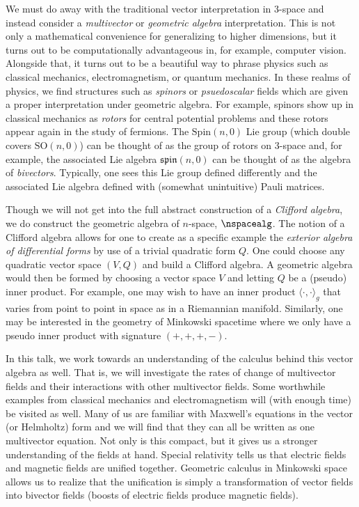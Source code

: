 We must do away with the traditional vector interpretation in 3-space and instead consider a \emph{multivector} or \emph{geometric algebra} interpretation. This is not only a mathematical convenience for generalizing to higher dimensions, but it turns out to be computationally advantageous in, for example, computer vision.  Alongside that, it turns out to be a beautiful way to phrase physics such as classical mechanics, electromagnetism, or quantum mechanics.  In these realms of physics, we find structures such as \emph{spinors} or \emph{psuedoscalar} fields which are given a proper interpretation under geometric algebra. For example, spinors show up in classical mechanics as \emph{rotors} for central potential problems and these rotors appear again in the study of fermions.  The $\textrm{Spin}(n,0)$ Lie group (which double covers $\mathrm{SO}(n,0)$) can be thought of as the group of rotors on 3-space and, for example, the associated Lie algebra $\mathfrak{spin}(n,0)$ can be thought of as the algebra of \emph{bivectors}. Typically, one sees this Lie group defined differently and the associated Lie algebra defined with (somewhat unintuitive) Pauli matrices. 

Though we will not get into the full abstract construction of a \emph{Clifford algebra}, we do construct the geometric algebra of $n$-space, $\nspacealg$.  The notion of a Clifford algebra allows for one to create as a specific example the \emph{exterior algebra of differential forms} by use of a trivial quadratic form $Q$.  One could choose any quadratic vector space $(V,Q)$ and build a Clifford algebra.  A geometric algebra would then be formed by choosing a vector space $V$ and letting $Q$ be a (pseudo) inner product.  For example, one may wish to have an inner product $\langle \cdot, \cdot \rangle_g$ that varies from point to point in space as in a Riemannian manifold.  Similarly, one may be interested in the geometry of Minkowski spacetime where we only have a pseudo inner product with signature $(+,+,+,-)$.  

In this talk, we work towards an understanding of the calculus behind this vector algebra as well.  That is, we will investigate the rates of change of multivector fields and their interactions with other multivector fields.  Some worthwhile examples from classical mechanics and electromagnetism will (with enough time) be visited as well.  Many of us are familiar with Maxwell's equations in the vector (or Helmholtz) form and we will find that they can all be written as one multivector equation.  Not only is this compact, but it gives us a stronger understanding of the fields at hand. Special relativity tells us that electric fields and magnetic fields are unified together.  Geometric calculus in Minkowski space allows us to realize that the unification is simply a transformation of vector fields into bivector fields (boosts of electric fields produce magnetic fields).  

